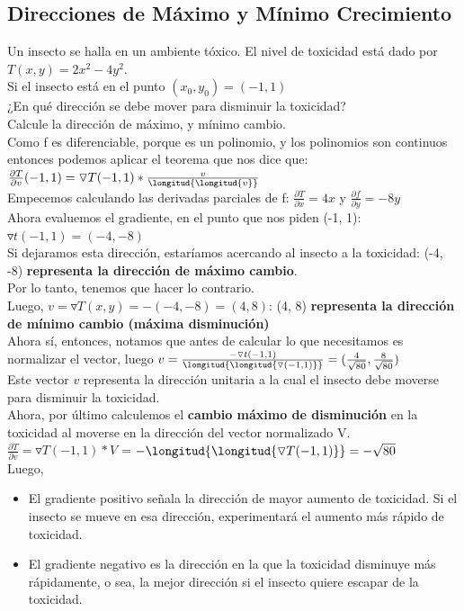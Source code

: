 \documentclass[10pt,a4paper]{article}
\begin{document}
\subsection*{Direcciones de Máximo y Mínimo Crecimiento}
\label{subsec:maxima_minima_direccion}
Un insecto se halla en un ambiente tóxico. El nivel de toxicidad está dado por $T(x,y) = 2x^{2} - 4y^{2}$. \\
Si el insecto está en el punto $(x_{0}, y_{0}) = (-1, 1)$ \\
¿En qué dirección se debe mover para disminuir la toxicidad? \\
Calcule la dirección de máximo, y mínimo cambio. \\
Como f es diferenciable, porque es un polinomio, y los polinomios son continuos entonces podemos aplicar el teorema que nos dice que: $\frac{\partial T}{\partial v}(-1, 1) = \triangledown T (-1, 1) * \frac{v}{\longitud{\longitud{v}}}$ \\
Empecemos calculando las derivadas parciales de f: $\frac{\partial T}{\partial x} = 4x$ y $\frac{\partial f}{\partial y} = -8y$ \\
Ahora evaluemos el gradiente, en el punto que nos piden (-1, 1): $\triangledown t(-1, 1) = (-4, -8)$ \\
Si dejaramos esta dirección, estaríamos acercando al insecto a la toxicidad: (-4, -8) \textbf{representa la dirección de máximo cambio}. \\
Por lo tanto, tenemos que hacer lo contrario. \\
Luego, $v = \triangledown T(x,y) = - (-4, -8) = (4, 8)$: (4, 8) \textbf{representa la dirección de mínimo cambio (máxima disminución)} \\
Ahora sí, entonces, notamos que antes de calcular lo que necesitamos es normalizar el vector, luego $ v = \frac{- \triangledown t(-1, 1)}{\longitud{\longitud{\triangledown(-1, 1)}}}= (\frac{4}{\sqrt{80}}, \frac{8}{\sqrt{80}})$ \\
Este vector $v$ representa la dirección unitaria a la cual el insecto debe moverse para disminuir la toxicidad. \\
Ahora, por último calculemos el \textbf{cambio máximo de disminución} en la toxicidad al moverse en la dirección del vector normalizado V. \\
$\frac{\partial T}{\partial v} = \triangledown T(-1, 1) * V$ = $- \longitud{\longitud{\triangledown T(-1, 1)}} = - \sqrt{80}$  \\
Luego,  
\begin{itemize}
    \item El gradiente positivo señala la dirección de mayor aumento de toxicidad. Si el insecto se mueve en esa dirección, experimentará el aumento más rápido de toxicidad.
    \item El gradiente negativo es la dirección en la que la toxicidad disminuye más rápidamente, o sea, la mejor dirección si el insecto quiere escapar de la toxicidad.
\end{itemize}
\end{document}
